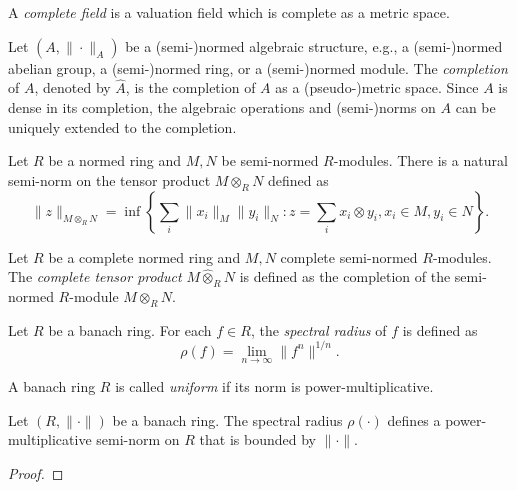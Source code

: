     \begin{definition}\label{def:complete_field}
        A \emph{complete field} is a valuation field which is complete as a metric space.
    \end{definition}

    \begin{definition}\label{def:completion_of_normed_algebraic_structures}
        Let \((A, \|\cdot\|_A)\) be a (semi-)normed algebraic structure, e.g., a (semi-)normed abelian group, a (semi-)normed ring, or a (semi-)normed module.
        The \emph{completion} of \(A\), denoted by \(\widehat{A}\), is the completion of \(A\) as a (pseudo-)metric space.
        Since \(A\) is dense in its completion, the algebraic operations and (semi-)norms on \(A\) can be uniquely extended to the completion.
    \end{definition}
    
    Let \(R\) be a normed ring and \(M,N\) be semi-normed \(R\)-modules.
    There is a natural semi-norm on the tensor product \(M \otimes_R N\) defined as
    \[
        \|z\|_{M \otimes_R N} = \inf \left\{ \sum_{i} \|x_i\|_M \|y_i\|_N : z = \sum_i x_i \otimes y_i, x_i \in M, y_i \in N \right\}.
    \]

    \begin{definition}\label{def:complete_tensor_product}
        Let \(R\) be a complete normed ring and \(M,N\) complete semi-normed \(R\)-modules.
        The \emph{complete tensor product} \(M \widehat{\otimes}_R N\) is defined as the completion of the semi-normed \(R\)-module \(M \otimes_R N\).
    \end{definition}

    \begin{definition}\label{def:spectral_radius_on_banach_rings}
        Let \(R\) be a banach ring.
        For each \(f \in R\), the \emph{spectral radius} of \(f\) is defined as
        \[
            \rho(f) = \lim_{n \to \infty} \|f^n\|^{1/n}.
        \]
    \end{definition}

    \begin{definition}\label{def:uniform_banach_ring}
        A banach ring \(R\) is called \emph{uniform} if its norm is power-multiplicative.
    \end{definition}

    \begin{proposition}\label{prop:spectral_radius_defines_a_power-multiplicative_semi-norm}
        Let \((R,\|\cdot\|)\) be a banach ring.
        The spectral radius \(\rho(\cdot)\) defines a power-multiplicative semi-norm on \(R\) that is bounded by \(\|\cdot\|\).
    \end{proposition}
    \begin{proof}
    \end{proof}

